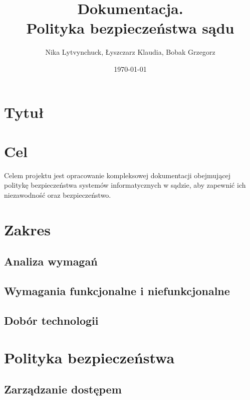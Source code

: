\documentclass[12pt,a4paper]{article}
\begin{document}
\title{Dokumentacja. \\ Polityka bezpieczeństwa sądu}

\author{Nika Lytvynchuck, Łyszczarz Klaudia, Bobak Grzegorz}
\date{\today}

\maketitle

\begin{abstract}
\end{abstract}

\newpage

\tableofcontents
\listoftables
\listoffigures

\newpage

\section{Tytuł}
\section{Cel}
Celem projektu jest opracowanie kompleksowej dokumentacji obejmującej politykę bezpieczeństwa systemów informatycznych w sądzie, aby zapewnić ich niezawodność oraz bezpieczeństwo.

\section{Zakres}
\subsection{Analiza wymagań}

\subsection{Wymagania funkcjonalne i niefunkcjonalne}

\subsection{Dobór technologii}


\section{Polityka bezpieczeństwa}
\subsection{Zarządzanie dostępem}

\end{document}
